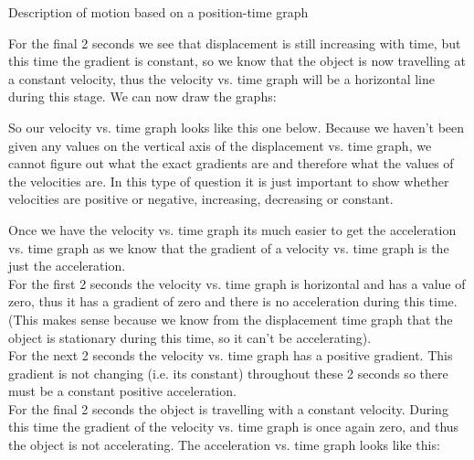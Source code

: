 \begin{wex}{Description of motion based on a position-time graph}
{
For the final 2 seconds we see that displacement is still increasing with time, but this time the gradient is constant, so we know that the object is now travelling at a constant velocity, thus the velocity vs. time graph will be a horizontal line during this stage. We can now draw the graphs:

So our velocity vs. time graph looks like this one below. Because we haven't been given any values on the vertical axis of the displacement vs. time graph, we cannot figure out what the exact gradients are and therefore what the values of the velocities are. In this type of question it is just important to show whether velocities are positive or negative, increasing, decreasing or constant.

\begin{center}
\end{center}

Once we have the velocity vs. time graph its much easier to get the acceleration vs. time graph as we know that the gradient of a velocity vs. time graph is the just the acceleration.\\

For the first 2 seconds the velocity vs. time graph is horizontal and has a value of zero, thus it has a gradient of zero and there is no acceleration during this time. (This makes sense because we know from the displacement time graph that the object is stationary during this time, so it can't be accelerating).\\

For the next 2 seconds the velocity vs. time graph has a positive gradient. This gradient is not changing (i.e. its constant) throughout these 2 seconds so there must be a constant positive acceleration.\\

For the final 2 seconds the object is travelling with a constant velocity. During this time the gradient of the velocity vs. time graph is once again zero, and thus the object is not accelerating.
The acceleration vs. time graph looks like this:

}
\end{wex}
